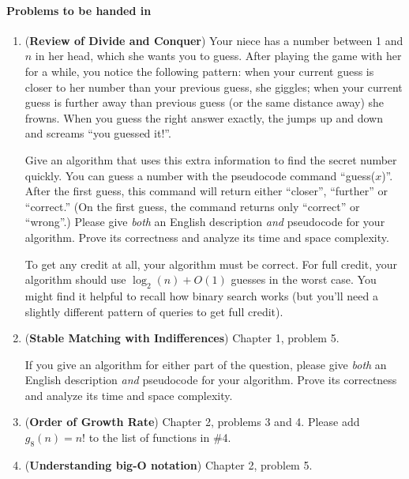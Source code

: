 \documentclass[letterpaper,11pt]{article}
\begin{document}
\paragraph{Problems to be handed in}

\begin{enumerate}
\item ({\bf Review of Divide and Conquer}) Your niece has a number between 1 and $n$
  in her head, which she wants you to guess. After playing the game
  with her for a while, you notice the following pattern: when your
  current guess is closer to her number than your previous guess, she
  giggles; when your current guess is further away than previous guess
  (or the same distance away) she frowns. When you guess the right
  answer exactly, the jumps up and down and screams ``you guessed
  it!''.

  Give an algorithm that uses this extra information to find the
  secret number quickly. You can guess a number with the pseudocode
  command ``guess($x$)''. After the first guess, this command will
  return either ``closer'', ``further'' or ``correct.'' (On the first
  guess, the command returns only ``correct'' or ``wrong''.) Please give
  {\em both} an English description {\em and} pseudocode for your
  algorithm. Prove its correctness and analyze its time and space complexity.

  To get any credit at all, your algorithm must be correct. For full
  credit, your algorithm should use $\log_2(n) + O(1)$ guesses in the
  worst case. You might find it helpful to recall how binary search
  works (but you'll need a slightly different pattern of queries to
  get full credit).

\item ({\bf Stable Matching with Indifferences}) Chapter 1, problem 5. 

If you give an algorithm for either part of the question, please give {\em both} an English description {\em and} pseudocode for your algorithm. Prove its correctness and analyze its time and space complexity. 



\item ({\bf Order of Growth Rate}) Chapter 2, problems 3 and 4. Please add $g_8(n)=n!$ to the list of functions in \#4.

\item ({\bf Understanding big-O notation}) Chapter 2, problem 5.


\end{enumerate}
\end{document}
